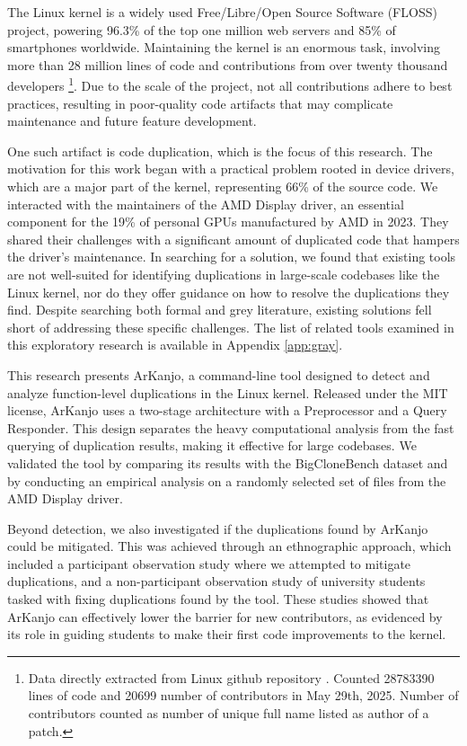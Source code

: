 \en

The Linux kernel is a widely used Free/Libre/Open Source Software (FLOSS) project, 
powering 96.3\% of the top one million web servers and 85\% of smartphones worldwide. 
Maintaining the kernel is an enormous task, involving more than 28 million lines of 
code and contributions from over twenty thousand developers
\footnote{Data directly extracted from Linux github repository \citep{linuxrepo}.
Counted  28783390 lines of code and 20699 number of contributors in May 29th, 2025.
Number of contributors counted as number of unique full name listed as author of a patch.}.
Due to the scale of the project, not all contributions adhere to best practices, resulting 
in poor-quality code artifacts that may complicate maintenance and future feature development.

One such artifact is code duplication, which is the focus of this research. The motivation for 
this work began with a practical problem rooted in device drivers, which are a major part 
of the kernel, representing 66\% of the source code\citep{marcelo}. We interacted with the 
maintainers of the AMD Display driver, an essential component for the 19\% of personal GPUs 
manufactured by AMD in 2023\citep{gpumarket}. They shared their challenges with a significant 
amount of duplicated code that hampers the driver's maintenance. In searching for a solution, 
we found that existing tools are not well-suited for identifying duplications in large-scale 
codebases like the Linux kernel, nor do they offer guidance on how to resolve the duplications 
they find. Despite searching both formal and grey literature, existing solutions fell short of 
addressing these specific challenges. The list of related tools examined in this exploratory 
research is available in Appendix \ref{app:gray}.

This research presents ArKanjo, a command-line tool designed to detect and analyze function-level 
duplications in the Linux kernel. Released under the MIT license, ArKanjo uses a two-stage 
architecture with a Preprocessor and a Query Responder. This design separates the heavy 
computational analysis from the fast querying of duplication results, making it effective for 
large codebases. We validated the tool by comparing its results with the BigCloneBench dataset
\citep{bigclonebench} and by conducting an empirical analysis on a randomly selected set of 
files from the AMD Display driver.

Beyond detection, we also investigated if the duplications found by ArKanjo could be mitigated.
This was achieved through an ethnographic approach, which included a participant observation 
study where we attempted to mitigate duplications, and a non-participant observation study of 
university students tasked with fixing duplications found by the tool. These studies showed that 
ArKanjo can effectively lower the barrier for new contributors, as evidenced by its role in 
guiding students to make their first code improvements to the kernel.

